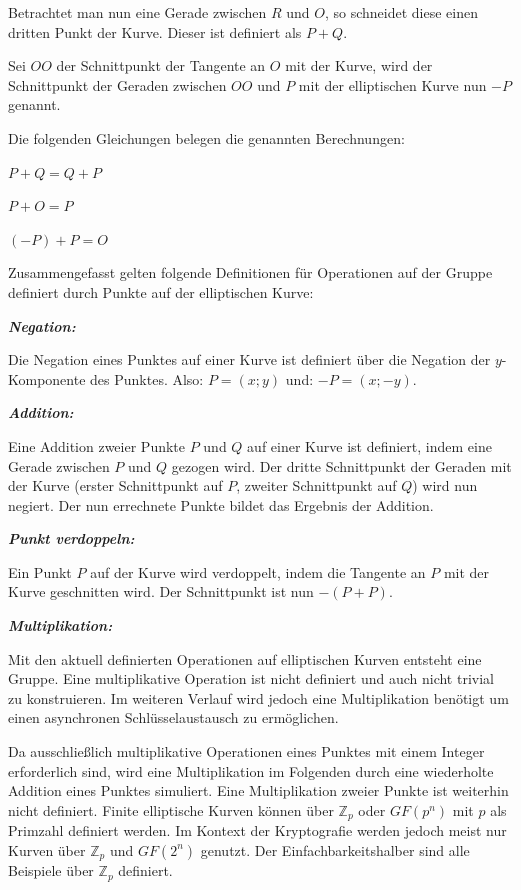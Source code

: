 Betrachtet man nun eine Gerade zwischen $R$ und $O$, so schneidet diese einen dritten Punkt der Kurve. 
Dieser ist definiert als $P + Q$.

Sei $OO$ der Schnittpunkt der Tangente an $O$ mit der Kurve, wird der Schnittpunkt der Geraden zwischen $OO$ und $P$ mit der elliptischen Kurve nun $-P$ genannt.\cite{explicit_addition}

Die folgenden Gleichungen belegen die genannten Berechnungen:
	
\begin{center}
	$P + Q = Q + P$
	
	$P + O = P$
	
	$(-P) + P = O$
\end{center}

Zusammengefasst gelten folgende Definitionen für Operationen auf der Gruppe definiert durch Punkte auf der 
elliptischen Kurve:

\textit{\textbf{Negation:}}

Die Negation eines Punktes auf einer Kurve ist definiert über die Negation der $y$-Komponente des Punktes.
Also: $P = (x;y)$ und: $-P = (x;-y)$.

\textit{\textbf{Addition:}}

Eine Addition zweier Punkte $P$ und $Q$ auf einer Kurve ist definiert, indem eine Gerade zwischen $P$ und $Q$ 
gezogen wird. Der dritte Schnittpunkt der Geraden mit der Kurve (erster Schnittpunkt auf $P$, zweiter 
Schnittpunkt auf $Q$) wird nun negiert. Der nun errechnete Punkte bildet das Ergebnis der Addition.

\textit{\textbf{Punkt verdoppeln:}}

Ein Punkt $P$ auf der Kurve wird verdoppelt, indem die Tangente an $P$ mit der Kurve geschnitten wird. Der Schnittpunkt
ist nun $-(P+P)$.

\textit{\textbf{Multiplikation:}}

Mit den aktuell definierten Operationen auf elliptischen Kurven entsteht eine Gruppe. 
Eine multiplikative Operation ist nicht definiert und auch nicht trivial zu konstruieren.
Im weiteren Verlauf wird jedoch eine Multiplikation benötigt um einen asynchronen Schlüsselaustausch zu ermöglichen.

Da ausschließlich multiplikative Operationen eines Punktes mit einem Integer erforderlich sind, wird 
eine Multiplikation im Folgenden durch eine wiederholte Addition eines Punktes simuliert.
Eine Multiplikation zweier Punkte ist weiterhin nicht definiert.
\newline
\newline
Finite elliptische Kurven können über $\mathbb{Z}_p$ oder $GF(p^n)$ mit $p$ als Primzahl definiert werden.
Im Kontext der Kryptografie werden jedoch meist nur Kurven über $\mathbb{Z}_p$ und $GF(2^n)$ genutzt.
Der Einfachbarkeitshalber sind alle Beispiele über $\mathbb{Z}_p$ definiert.


